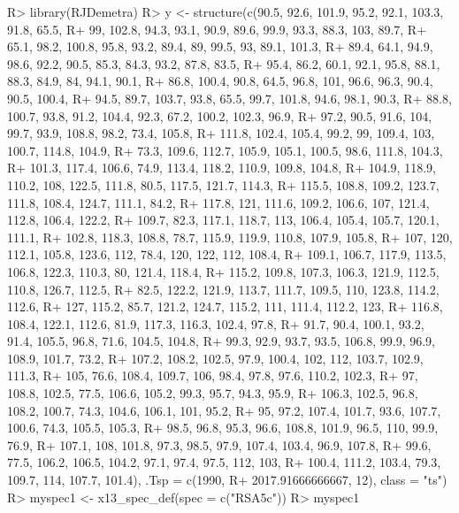 \documentclass[article]{jss}
\begin{document}
\begin{CodeChunk}

\begin{CodeInput}
R> library(RJDemetra)
R> y <- structure(c(90.5, 92.6, 101.9, 95.2, 92.1, 103.3, 91.8, 65.5, 
R+ 99, 102.8, 94.3, 93.1, 90.9, 89.6, 99.9, 93.3, 88.3, 103, 89.7, 
R+ 65.1, 98.2, 100.8, 95.8, 93.2, 89.4, 89, 99.5, 93, 89.1, 101.3, 
R+ 89.4, 64.1, 94.9, 98.6, 92.2, 90.5, 85.3, 84.3, 93.2, 87.8, 83.5, 
R+ 95.4, 86.2, 60.1, 92.1, 95.8, 88.1, 88.3, 84.9, 84, 94.1, 90.1, 
R+ 86.8, 100.4, 90.8, 64.5, 96.8, 101, 96.6, 96.3, 90.4, 90.5, 100.4, 
R+ 94.5, 89.7, 103.7, 93.8, 65.5, 99.7, 101.8, 94.6, 98.1, 90.3, 
R+ 88.8, 100.7, 93.8, 91.2, 104.4, 92.3, 67.2, 100.2, 102.3, 96.9, 
R+ 97.2, 90.5, 91.6, 104, 99.7, 93.9, 108.8, 98.2, 73.4, 105.8, 
R+ 111.8, 102.4, 105.4, 99.2, 99, 109.4, 103, 100.7, 114.8, 104.9, 
R+ 73.3, 109.6, 112.7, 105.9, 105.1, 100.5, 98.6, 111.8, 104.3, 
R+ 101.3, 117.4, 106.6, 74.9, 113.4, 118.2, 110.9, 109.8, 104.8, 
R+ 104.9, 118.9, 110.2, 108, 122.5, 111.8, 80.5, 117.5, 121.7, 114.3, 
R+ 115.5, 108.8, 109.2, 123.7, 111.8, 108.4, 124.7, 111.1, 84.2, 
R+ 117.8, 121, 111.6, 109.2, 106.6, 107, 121.4, 112.8, 106.4, 122.2, 
R+ 109.7, 82.3, 117.1, 118.7, 113, 106.4, 105.4, 105.7, 120.1, 111.1, 
R+ 102.8, 118.3, 108.8, 78.7, 115.9, 119.9, 110.8, 107.9, 105.8, 
R+ 107, 120, 112.1, 105.8, 123.6, 112, 78.4, 120, 122, 112, 108.4, 
R+ 109.1, 106.7, 117.9, 113.5, 106.8, 122.3, 110.3, 80, 121.4, 118.4, 
R+ 115.2, 109.8, 107.3, 106.3, 121.9, 112.5, 110.8, 126.7, 112.5, 
R+ 82.5, 122.2, 121.9, 113.7, 111.7, 109.5, 110, 123.8, 114.2, 112.6, 
R+ 127, 115.2, 85.7, 121.2, 124.7, 115.2, 111, 111.4, 112.2, 123, 
R+ 116.8, 108.4, 122.1, 112.6, 81.9, 117.3, 116.3, 102.4, 97.8, 
R+ 91.7, 90.4, 100.1, 93.2, 91.4, 105.5, 96.8, 71.6, 104.5, 104.8, 
R+ 99.3, 92.9, 93.7, 93.5, 106.8, 99.9, 96.9, 108.9, 101.7, 73.2, 
R+ 107.2, 108.2, 102.5, 97.9, 100.4, 102, 112, 103.7, 102.9, 111.3, 
R+ 105, 76.6, 108.4, 109.7, 106, 98.4, 97.8, 97.6, 110.2, 102.3, 
R+ 97, 108.8, 102.5, 77.5, 106.6, 105.2, 99.3, 95.7, 94.3, 95.9, 
R+ 106.3, 102.5, 96.8, 108.2, 100.7, 74.3, 104.6, 106.1, 101, 95.2, 
R+ 95, 97.2, 107.4, 101.7, 93.6, 107.7, 100.6, 74.3, 105.5, 105.3, 
R+ 98.5, 96.8, 95.3, 96.6, 108.8, 101.9, 96.5, 110, 99.9, 76.9, 
R+ 107.1, 108, 101.8, 97.3, 98.5, 97.9, 107.4, 103.4, 96.9, 107.8, 
R+ 99.6, 77.5, 106.2, 106.5, 104.2, 97.1, 97.4, 97.5, 112, 103, 
R+ 100.4, 111.2, 103.4, 79.3, 109.7, 114, 107.7, 101.4), .Tsp = c(1990, 
R+ 2017.91666666667, 12), class = "ts")
R> myspec1 <- x13_spec_def(spec = c("RSA5c"))
R> myspec1
\end{CodeInput}


\end{CodeChunk}
\end{document}
